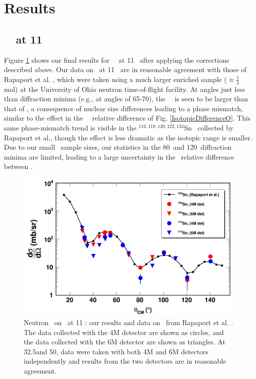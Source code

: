 \section{Results}
\subsection{\snTwelveFour\ \el\ at 11 \mega\electronvolt}
Figure \ref{SnECS_11MeV} shows our final results for \snTwelveFour\
\el\ at 11 \mega\electronvolt\ after applying the corrections described above. Our data on \snFour\
at 11 \mega\electronvolt\ are in reasonable agreement with those of Rapaport et al.
\cite{Rapaport1980}, which were taken using a much larger enriched sample
($\approx\frac{1}{3}$ mol) at the University of Ohio neutron time-of-flight
facility. At angles just less than diffraction minima (e.g., at
angles of 65-70\textdegree), the \snTwelve\ \el\ is seen to be larger
than that of \snFour, a consequence of nuclear size
differences leading to a phase mismatch, similar to the effect in the \oSixEight\
\tot\ relative difference of Fig. \ref{IsotopicDifferenceO}. This same
phase-mismatch trend is
visible in the $^{116,118,120,122,124}$Sn \el\ collected by Rapaport et al.,
though the effect is less dramatic as the isotopic range is smaller.
Due to our small \snTwelveFour\ sample sizes,
our statistics in the 80\textdegree\ and 120\textdegree\ diffraction minima are
limited, leading to a large uncertainty in the \el\ relative difference between
\snTwelveFour.

\begin{figure}[tb]
    \centering
    \includegraphics[width = 1.0\textwidth]{figures/ECSResults2017.png}
    \caption[Neutron \el\ on \snTwelveFour\ at 11 \mega\electronvolt: our results and literature data]
    {
        Neutron \el\ on \snTwelveFour\ at 11 \mega\electronvolt: our results and data on
        \snFour\ from Rapaport et al. \cite{Rapaport1980}. The data collected
        with the 4M detector are shown as circles, and the data collected
        with the 6M detector are shown as triangles. At 32.5\textdegree and
        50\textdegree, data were taken with both 4M and 6M detectors independently
        and results from the two detectors are in reasonable agreement.
    }
    \label{SnECS_11MeV}
\end{figure}

